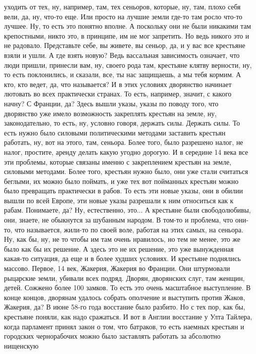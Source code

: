 уходить от тех, ну, например, там, тех сеньоров, которые, ну, там, плохо себя
вели, да, ну, что-то еще. Или просто на лучшие земли где-то там росло что-то
лучшее. Ну, то есть это понятно вполне. А поскольку они не были никакими там
крепостными, никто это, в принципе, им не мог запретить. Но ведь никого это и не
радовало. Представьте себе, вы живете, вы сеньор, да, и у вас все крестьяне
взяли и ушли. А где взять новую? Ведь вассальная зависимость означает, что люди
пришли, принесли вам, ну, своего рода там, крестьяне клятву верности, ну, то
есть поклонились, и сказали, все, ты нас защищаешь, а мы тебя кормим. А кто, кто
ведет, да, что называется? И в этих условиях дворянство начинает лютовать во
всех практически странах. То есть, например, значит, с какого начну? С Франции,
да? Здесь вышли указы, указы по поводу того, что дворянство уже имело
возможность закреплять крестьян на земле, ну, законодательно, то есть, ну,
условно говоря, держать силы. Держать силы. То есть нужно было силовыми
политическими методами заставить крестьян работать, ну, вот на этого, там,
сеньора. Более того, было разрешено налог, не налог, простите, аренду делать
какую угодно дорогую. И в середине 14 века все эти проблемы, которые связаны
именно с закреплением крестьян на земле, силовыми методами. Более того, крестьян
нужно было, они уже стали считаться беглыми, их можно было поймать, и уже тех
вот пойманных крестьян можно было превращать практически в рабов. То есть эти
новые указы, они в обилии вышли по всей Европе, эти новые указы разрешали к ним
относиться как к рабам. Понимаете, да? Ну, естественно, это... А крестьяне были
свободолюбивы, они, знаете, не обыкнутся за шубанным народом. В том-то и
проблема, что они-то, что называется, жили-то по своей воле, работая на этих
самых, на сеньора. Ну, как бы, ну, не то чтобы им там очень нравилось, но тем не
менее, это же было как бы их решение. А здесь это не их решение, это уже
вынужденная какая-то ситуация, да еще и в более худших условиях. И крестьяне
поднялись массово. Первое, 14 век, Жакерия, Жакерия во Франции. Они штурмовали
рыцарские земли, убивали всех подряд. Дворян, дворянских слуг, там женщин,
детей. Сожжено более 100 замков. То есть это очень масштабное выступление. В
конце концов, дворянам удалось собрать ополчение и выступить против Жаков,
Жакерия, да? В июне 58-го года восстание было разбито. Но с тех пор, как бы,
крестьяне поняли, как надо сражаться. И вот в Англии восстание у Улта Тайлера,
когда парламент принял закон о том, что батраков, то есть наемных крестьян и
городских чернорабочих можно было заставлять работать за абсолютно нищенскую
